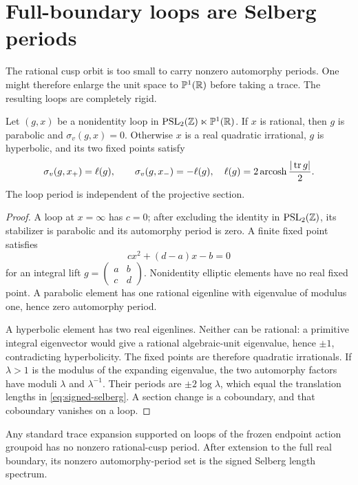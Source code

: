 \section{Full-boundary loops are Selberg periods}

The rational cusp orbit is too small to carry nonzero automorphy periods.  One
might therefore enlarge the unit space to \(\mathbb P^1(\mathbb{R})\) before taking a
trace.  The resulting loops are completely rigid.

\begin{theorem}
Let \((g,x)\) be a nonidentity loop in
\(\operatorname{PSL}_2(\mathbb{Z})\ltimes\mathbb P^1(\mathbb{R})\).  If \(x\) is rational, then \(g\) is
parabolic and \(\sigma_v(g,x)=0\).  Otherwise \(x\) is a real quadratic
irrational, \(g\) is hyperbolic, and its two fixed points satisfy
\begin{equation}
\sigma_v(g,x_+)=\ell(g),\qquad
\sigma_v(g,x_-)=-\ell(g),
\quad
\ell(g)=2\operatorname{arcosh}\frac{|\operatorname{tr} g|}{2}.
\label{eq:signed-selberg}
\end{equation}
The loop period is independent of the projective section.
\end{theorem}

\begin{proof}
A loop at \(x=\infty\) has \(c=0\); after excluding the identity in
\(\operatorname{PSL}_2(\mathbb{Z})\), its stabilizer is parabolic and its automorphy period is zero.
A finite fixed point satisfies
\[
cx^2+(d-a)x-b=0
\]
for an integral lift
\(g=\left(\begin{smallmatrix}a&b\\c&d\end{smallmatrix}\right)\).
Nonidentity elliptic elements have no real fixed point.  A parabolic element
has one rational eigenline with eigenvalue of modulus one, hence zero
automorphy period.

A hyperbolic element has two real eigenlines.  Neither can be rational: a
primitive integral eigenvector would give a rational algebraic-unit
eigenvalue, hence \(\pm1\), contradicting hyperbolicity.  The fixed points are
therefore quadratic irrationals.  If \(\lambda>1\) is the modulus of the
expanding eigenvalue, the two automorphy factors have moduli \(\lambda\) and
\(\lambda^{-1}\).  Their periods are \(\pm2\log\lambda\), which equal the
translation lengths in \cref{eq:signed-selberg}.  A section change is a
coboundary, and that coboundary vanishes on a loop.
\end{proof}

\begin{corollary}
Any standard trace expansion supported on loops of the frozen endpoint action
groupoid has no nonzero rational-cusp period.  After extension to the full
real boundary, its nonzero automorphy-period set is the signed Selberg length
spectrum.
\end{corollary}

